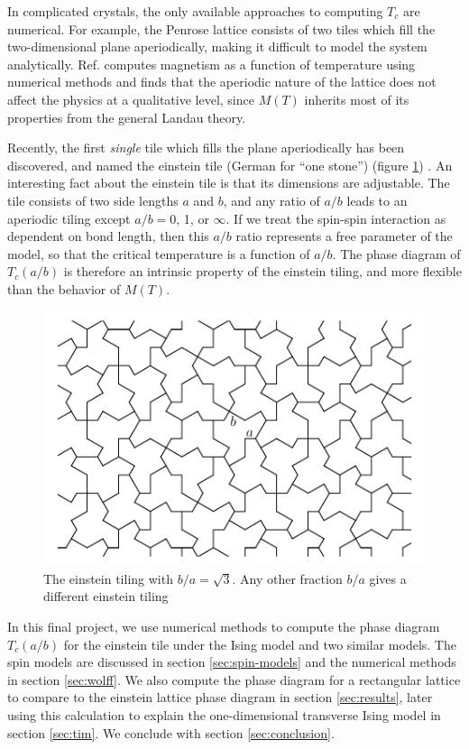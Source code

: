\documentclass[
  amsmath,
  amssymb,
  aps,
  twocolumn,
  nofootinbib,
  nolongbibliography,
  floatfix,
]{revtex4-2}
\begin{document}
In complicated crystals, the only available approaches to computing $T_c$ are numerical. For example, the Penrose lattice consists of two tiles which fill the two-dimensional plane aperiodically, making it difficult to model the system analytically. Ref. \cite{penrose-ising} computes magnetism as a function of temperature using numerical methods and finds that the aperiodic nature of the lattice does not affect the physics at a qualitative level, since $M(T)$ inherits most of its properties from the general Landau theory.

Recently, the first \textit{single} tile which fills the plane aperiodically has been discovered, and named the einstein tile (German for ``one stone'') (figure \ref{fig:einstein}) \cite{smith2023aperiodic}. An interesting fact about the einstein tile is that its dimensions are adjustable. The tile consists of two side lengths $a$ and $b$, and any ratio of $a/b$ leads to an aperiodic tiling except $a/b=0$, 1, or $\infty$. If we treat the spin-spin interaction as dependent on bond length, then this $a/b$ ratio represents a free parameter of the model, so that the critical temperature is a function of $a/b$. The phase diagram of $T_c(a/b)$ is therefore an intrinsic property of the einstein tiling, and more flexible than the behavior of $M(T)$.

\begin{figure}
  \centering
  \includegraphics[width=\linewidth]{../figs/einstein.pdf}
  \caption{The einstein tiling with $b/a=\sqrt{3}$. Any other fraction $b/a$ gives a different einstein tiling}
  \label{fig:einstein}
\end{figure}

In this final project, we use numerical methods to compute the phase diagram $T_c(a/b)$ for the einstein tile under the Ising model and two similar models. The spin models are discussed in section \ref{sec:spin-models} and the numerical methods in section \ref{sec:wolff}. We also compute the phase diagram for a rectangular lattice to compare to the einstein lattice phase diagram in section \ref{sec:results}, later using this calculation to explain the one-dimensional transverse Ising model in section \ref{sec:tim}. We conclude with section \ref{sec:conclusion}.
\end{document}
